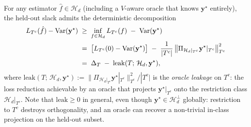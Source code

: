 \documentclass[11pt,a4paper]{article}
\theoremstyle{plain}
\theoremstyle{definition}
\theoremstyle{remark}
\newcommand{\by}{\mathbf{y}}
\newcommand{\Var}{\mathrm{Var}}
\newcommand{\Hcal}{\mathcal{H}}
\begin{document}
For any estimator $\hat f \in \Hcal_d$ (including a $V$-aware
oracle that knows $\by^\star$ entirely), the held-out slack admits
the deterministic decomposition
\begin{align}
    L_{T^c}(\hat f) - \Var(\by^\star)
    &\;\ge\; \inf_{f \in \Hcal_d} L_{T^c}(f) \;-\; \Var(\by^\star)
    \notag\\
    &\;=\; \big[L_{T^c}(0) - \Var(\by^\star)\big]
        \;-\; \frac{1}{|T^c|}\,\big\|\Pi_{\Hcal_d|_{T^c}}\by^\star|_{T^c}\big\|_{T^c}^2
    \notag\\
    &\;=\; \Delta_T \;-\; \mathrm{leak}(T;\, \Hcal_d, \by^\star),
    \label{eq:oracle-decomposition}
\end{align}
where $\mathrm{leak}(T;\, \Hcal_d, \by^\star) :=
\|\Pi_{\Hcal_d|_{T^c}}\by^\star|_{T^c}\|_{T^c}^2/|T^c|$ is the
\emph{oracle leakage} on $T^c$: the loss reduction achievable by an
oracle that projects $\by^\star|_{T^c}$ onto the restriction class
$\Hcal_d|_{T^c}$.  Note that $\mathrm{leak} \ge 0$ in general,
even though $\by^\star \in \Hcal_d^\perp$ globally: restriction to
$T^c$ destroys orthogonality, and an oracle can recover a
non-trivial in-class projection on the held-out subset.
\end{document}
